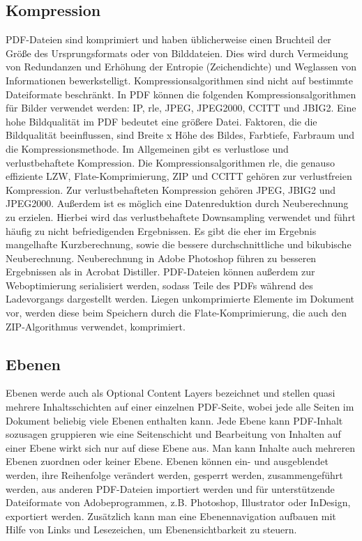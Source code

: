 \subsection{Kompression}
PDF-Dateien sind komprimiert und haben üblicherweise einen Bruchteil der Größe des Ursprungsformats oder von Bilddateien. Dies wird durch Vermeidung von Redundanzen und Erhöhung der Entropie (Zeichendichte) und Weglassen von Informationen bewerkstelligt. Kompressionsalgorithmen sind nicht auf bestimmte Dateiformate beschränkt. \cite{schneeberger} In PDF können die folgenden Kompressionsalgorithmen für Bilder verwendet werden: IP, \gls{rle}, JPEG, JPEG2000, CCITT und JBIG2. Eine hohe Bildqualität im PDF bedeutet eine größere Datei. Faktoren, die die Bildqualität beeinflussen, sind Breite x Höhe des Bildes, Farbtiefe, Farbraum und die Kompressionsmethode. \cite{softx} Im Allgemeinen gibt es verlustlose und verlustbehaftete Kompression. Die Kompressionsalgorithmen \gls{rle}, die genauso effiziente LZW, Flate-Komprimierung, ZIP und CCITT gehören zur verlustfreien Kompression. Zur verlustbehafteten Kompression gehören JPEG, JBIG2 und JPEG2000. Außerdem ist es möglich eine Datenreduktion durch Neuberechnung zu erzielen. Hierbei wird das verlustbehaftete Downsampling verwendet und führt häufig zu nicht befriedigenden Ergebnissen. Es gibt die eher im Ergebnis mangelhafte Kurzberechnung, sowie die bessere durchschnittliche und bikubische Neuberechnung. Neuberechnung in Adobe Photoshop führen zu besseren Ergebnissen als in Acrobat Distiller. \cite{schneeberger}
PDF-Dateien können außerdem zur Weboptimierung serialisiert werden, sodass Teile des PDFs während des Ladevorgangs dargestellt werden. Liegen unkomprimierte Elemente im Dokument vor, werden diese beim Speichern durch die Flate-Komprimierung, die auch den ZIP-Algorithmus verwendet, komprimiert.

\subsection{Ebenen}
Ebenen werde auch als Optional Content Layers bezeichnet und stellen quasi mehrere Inhaltsschichten auf einer einzelnen PDF-Seite, wobei jede alle Seiten im Dokument beliebig viele Ebenen enthalten kann. Jede Ebene kann PDF-Inhalt sozusagen gruppieren wie eine Seitenschicht und Bearbeitung von Inhalten auf einer Ebene wirkt sich nur auf diese Ebene aus. Man kann Inhalte auch mehreren Ebenen zuordnen oder keiner Ebene. Ebenen können ein- und ausgeblendet werden, ihre Reihenfolge verändert werden, gesperrt werden, zusammengeführt werden, aus anderen PDF-Dateien importiert werden und für unterstützende Dateiformate von Adobeprogrammen, z.B. Photoshop, Illustrator oder InDesign, exportiert werden. Zusätzlich kann man eine Ebenennavigation aufbauen mit Hilfe von Links und Lesezeichen, um Ebenensichtbarkeit zu steuern. \cite{adobe-ebenen}

